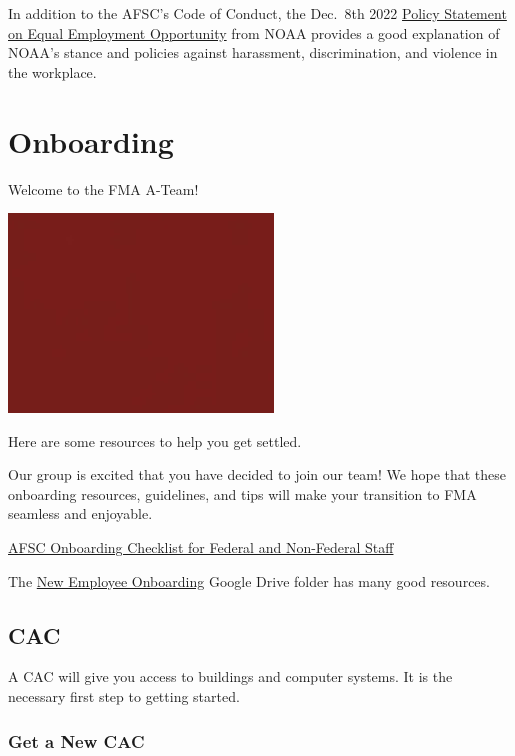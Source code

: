 \documentclass[
  letterpaper,
  DIV=11,
  numbers=noendperiod]{scrreprt}
\begin{document}
In addition to the AFSC's Code of Conduct, the Dec.~8th 2022
\href{https://www.noaa.gov/organization/inclusion-and-civil-rights/policy-statement-on-equal-employment-opportunity}{Policy
Statement on Equal Employment Opportunity} from NOAA provides a good
explanation of NOAA's stance and policies against harassment,
discrimination, and violence in the workplace.


\hypertarget{onboarding}{%
\chapter{Onboarding}\label{onboarding}}

Welcome to the FMA A-Team!

\includegraphics{200.webp}

Here are some resources to help you get settled.

Our group is excited that you have decided to join our team! We hope
that these onboarding resources, guidelines, and tips will make your
transition to FMA seamless and enjoyable.

\href{https://drive.google.com/file/d/1Gxg-tw76NeptYFkya7M6JSyxsy31mmAu/view?usp=sharing}{AFSC
Onboarding Checklist for Federal and Non-Federal Staff}

The
\href{https://drive.google.com/drive/folders/1aZcoJooHxNMh4kjCiv4WUgpDtszub1PI}{New
Employee Onboarding} Google Drive folder has many good resources.

\hypertarget{cac}{%
\section{CAC}\label{cac}}

A CAC will give you access to buildings and computer systems. It is the
necessary first step to getting started.

\hypertarget{get-a-new-cac}{%
\subsection{Get a New CAC}\label{get-a-new-cac}}
\end{document}

